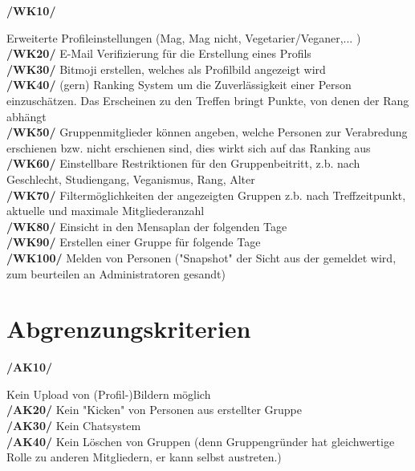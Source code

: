 \documentclass[a4paper]{scrreprt}
\begin{document}
\begin{addmargin}[25pt]{0pt} 
\hypertarget{wk10}{\textbf{/WK10/}} Erweiterte Profileinstellungen (Mag, Mag nicht, Vegetarier/Veganer,... )\\
\hypertarget{wk20}{\textbf{/WK20/}} E-Mail Verifizierung für die Erstellung eines Profils \\
\hypertarget{wk30}{\textbf{/WK30/}} Bitmoji erstellen, welches als Profilbild angezeigt wird\\
\hypertarget{wk40}{\textbf{/WK40/}} (gern) Ranking System um die Zuverlässigkeit einer Person einzuschätzen. Das Erscheinen zu den Treffen bringt Punkte, von denen der Rang abhängt\\
\hypertarget{wk50}{\textbf{/WK50/}} Gruppenmitglieder können angeben, welche Personen zur Verabredung erschienen bzw. nicht erschienen sind, dies wirkt sich auf das Ranking aus\\
\hypertarget{wk60}{\textbf{/WK60/}} Einstellbare Restriktionen für den Gruppenbeitritt, z.b. nach Geschlecht, Studiengang, Veganismus, Rang, Alter\\
\hypertarget{wk70}{\textbf{/WK70/}} Filtermöglichkeiten der angezeigten Gruppen z.b. nach Treffzeitpunkt, aktuelle und maximale Mitgliederanzahl\\
\hypertarget{wk80}{\textbf{/WK80/}} Einsicht in den Mensaplan der folgenden Tage\\
\hypertarget{wk90}{\textbf{/WK90/}} Erstellen einer Gruppe für folgende Tage\\
\hypertarget{wk100}{\textbf{/WK100/}} Melden von Personen ("Snapshot" der Sicht aus der gemeldet wird, zum beurteilen an Administratoren gesandt)\\
\end{addmargin}
 
\section{Abgrenzungskriterien}

\begin{addmargin}[25pt]{0pt} 
\hypertarget{ak10}{\textbf{/AK10/}} Kein Upload von (Profil-)Bildern möglich\\
\hypertarget{ak20}{\textbf{/AK20/}} Kein "Kicken" von Personen aus erstellter Gruppe\\
\hypertarget{ak30}{\textbf{/AK30/}} Kein Chatsystem\\
\hypertarget{ak40}{\textbf{/AK40/}} Kein Löschen von Gruppen (denn Gruppengründer hat gleichwertige Rolle zu anderen Mitgliedern, er kann selbst austreten.)\\
\end{addmargin}
\end{document}
